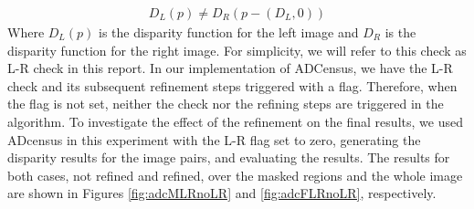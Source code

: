 \begin{align}
D_{L}(p) \neq D_{R}(p-(D_{L},0))
\end{align}
\noindent
Where $D_{L}(p)$ is the disparity function for the left image and $D_{R}$ is the disparity function for the right image. \newline
For simplicity, we will refer
to this check as L-R check in this report.
In our implementation of ADCensus, we have the L-R check and its subsequent refinement steps triggered with a flag.
Therefore, when the flag is not set, neither the check nor the refining steps are triggered in the algorithm.
To investigate the effect of the refinement on the final results, we used 
ADcensus in this experiment with the L-R flag set to zero, generating the disparity results for the image pairs, and evaluating the results.
The results for both cases, not refined and refined, over the masked regions and the whole image are shown in Figures \ref{fig:adcMLRnoLR} and \ref{fig:adcFLRnoLR}, respectively.

